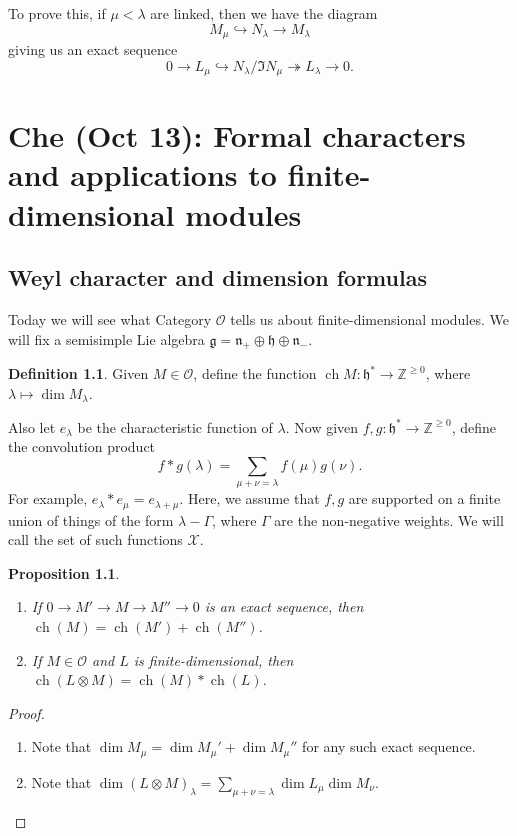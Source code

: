 \documentclass[leqno, openany]{memoir}
\newtheorem{prop}[thm]{Proposition}
\theoremstyle{definition}
\newtheorem{defn}[thm]{Definition}
\theoremstyle{remark}
\theoremstyle{plain}
\theoremstyle{definition}
\theoremstyle{remark}
\newcommand{\Z}{\mathbb{Z}}
\newcommand{\cO}{\mathcal{O}}
\newcommand{\g}{\mathfrak{g}}
\newcommand{\h}{\mathfrak{h}}
\newcommand{\n}{\mathfrak{n}}
\newcommand{\mc}[1]{\mathcal{#1}}
\DeclareMathOperator{\ch}{ch}
\begin{document}
To prove this, if $\mu < \lambda$ are linked, then we have the diagram
\[ M_{\mu} \hookrightarrow N_{\lambda} \to M_{\lambda} \]
giving us an exact sequence
\[ 0 \to L_{\mu} \hookrightarrow N_{\lambda} / \Im N_{\mu} \twoheadrightarrow L_{\lambda} \to 0. \]

\chapter{Che (Oct 13): Formal characters and applications to finite-dimensional modules}%
\label{cha:che_oct_13_formal_characters_and_applications_to_finite_dimensional_modules}

\section{Weyl character and dimension formulas}%
\label{sec:weyl_character_and_dimension_formulas}

Today we will see what Category $\cO$ tells us about finite-dimensional modules. We will fix a semisimple Lie algebra $\g = \n_+ \oplus \h \oplus \n_-$.

\begin{defn}
    Given $M \in \cO$, define the function $\operatorname{ch} M \colon \h^* \to \Z^{\geq 0}$, where $\lambda \mapsto \dim M_{\lambda}$.
\end{defn}

Also let $e_{\lambda}$ be the characteristic function of $\lambda$. Now given $f, g \colon \h^* \to \Z^{\geq 0}$, define the convolution product
\[ f * g (\lambda) = \sum_{\mu + \nu = \lambda} f(\mu) g(\nu). \]
For example, $e_{\lambda} * e_{\mu} = e_{\lambda + \mu}$. Here, we assume that $f, g$ are supported on a finite union of things of the form $\lambda - \Gamma$, where $\Gamma$ are the non-negative weights. We will call the set of such functions $\mc{X}$.

\begin{prop}\leavevmode
    \begin{enumerate}
        \item If $0 \to M' \to M \to M'' \to 0$ is an exact sequence, then $\ch(M) = \ch(M') + \ch(M'')$.
        \item If $M \in \cO$ and $L$ is finite-dimensional, then $\ch(L \otimes M) = \ch(M) * \ch(L)$.
    \end{enumerate}
\end{prop}

\begin{proof}\leavevmode
    \begin{enumerate}
        \item Note that $\dim M_{\mu} = \dim M_{\mu}' + \dim M_{\mu}''$ for any such exact sequence.
        \item Note that $\dim {(L \otimes M)}_{\lambda} = \sum_{\mu + \nu = \lambda} \dim L_{\mu} \dim M_{\nu}$.\qedhere
    \end{enumerate}
\end{proof}
\end{document}
